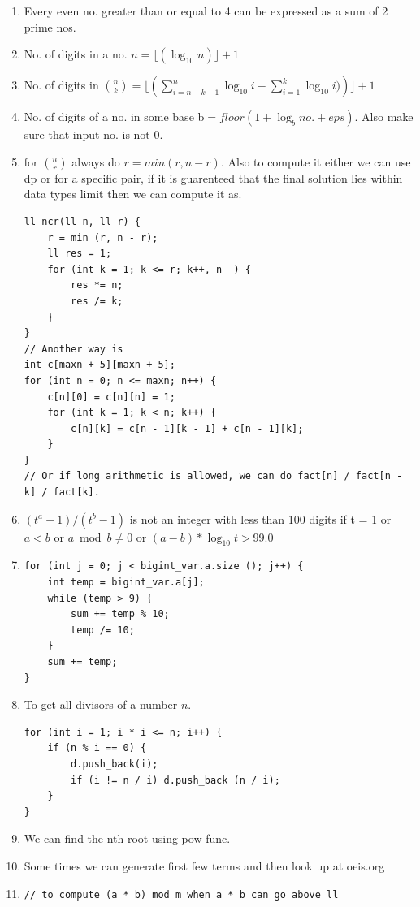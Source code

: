\documentclass[8pt, a4paper, oneside, twocolumn]{extarticle}
\begin{document}
\begin{enumerate}
    \item Every even no. greater than or equal to 4 can be expressed as a sum of 2 prime nos.
    \item No. of digits in a no. $n = \lfloor(\log_{10}{n})\rfloor + 1$
    \item No. of digits in $\binom{n}{k} = \lfloor(\sum_{i = n - k + 1}^{n}\log_{10}{i} - \sum_{i = 1}^{k}\log_{10}{i)})\rfloor + 1$
    \item No. of digits of a no. in some base b$ = floor(1 + \log_b{no.} + eps)$. Also make sure that input no. is not 0.
    \item for $\binom{n}{r}$ always do $r = min (r, n - r)$. Also to compute it either we can use dp or for a specific pair, if it is guarenteed that the final solution lies within data types limit then we can compute it as. \begin{verbatim}
ll ncr(ll n, ll r) {
    r = min (r, n - r);
    ll res = 1;
    for (int k = 1; k <= r; k++, n--) {
        res *= n;
        res /= k;
    }
}
// Another way is
int c[maxn + 5][maxn + 5];
for (int n = 0; n <= maxn; n++) {
    c[n][0] = c[n][n] = 1;
    for (int k = 1; k < n; k++) {
        c[n][k] = c[n - 1][k - 1] + c[n - 1][k];
    }
}
// Or if long arithmetic is allowed, we can do fact[n] / fact[n - k] / fact[k].
    \end{verbatim}
    \item $(t^a - 1) / (t^b - 1)$ is not an integer with less than 100 digits if t = 1 or $a < b$ or $a \bmod b \neq 0$ or $(a - b) * \log_{10}{t} > 99.0$
    \item \begin{verbatim}
for (int j = 0; j < bigint_var.a.size (); j++) {
    int temp = bigint_var.a[j];
    while (temp > 9) {
        sum += temp % 10;
        temp /= 10;
    }
    sum += temp;
}
    \end{verbatim}
    \item To get all divisors of a number $n$.
    \begin{verbatim}
for (int i = 1; i * i <= n; i++) {
    if (n % i == 0) {
        d.push_back(i);
        if (i != n / i) d.push_back (n / i);
    }
}
    \end{verbatim}
    \item We can find the nth root using pow func.
    \item Some times we can generate first few terms and then look up at oeis.org
    \item
\begin{verbatim}
// to compute (a * b) mod m when a * b can go above ll

\end{verbatim}
\end{enumerate}
\end{document}
